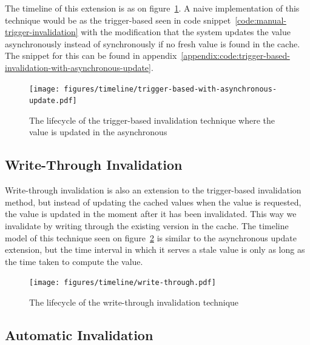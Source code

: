 The timeline of this extension is as on figure~\ref{fig:timeline:trigger-based-with-asynchronous-update}. A naive implementation of this technique would be as the trigger-based seen in code snippet~\ref{code:manual-trigger-invalidation} with the modification that the system updates the value asynchronously instead of synchronously if no fresh value is found in the cache. The snippet for this can be found in appendix~\ref{appendix:code:trigger-based-invalidation-with-asynchronous-update}.

\begin{figure}[ht!]
  \centering
  \texttt{[image: figures/timeline/trigger-based-with-asynchronous-update.pdf]}
  \caption{The lifecycle of the trigger-based invalidation technique where the value is updated in the asynchronous}
  \label{fig:timeline:trigger-based-with-asynchronous-update}
\end{figure}


\subsection{Write-Through Invalidation}
\label{subsec:write_through_invalidation}

Write-through invalidation is also an extension to the trigger-based invalidation method, but instead of updating the cached values when the value is requested, the value is updated in the moment after it has been invalidated. This way we invalidate by writing through the existing version in the cache. The timeline model of this technique seen on figure~\ref{fig:timeline:write-through} is similar to the asynchronous update extension, but the time interval in which it serves a stale value is only as long as the time taken to compute the value.

\begin{figure}[ht!]
  \centering
  \texttt{[image: figures/timeline/write-through.pdf]}
  \caption{The lifecycle of the write-through invalidation technique}
  \label{fig:timeline:write-through}
\end{figure}


\subsection{Automatic Invalidation}
\label{subsec:automatic_invalidation}

